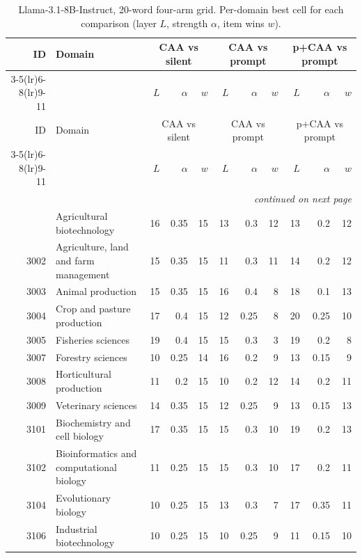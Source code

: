 \vspace{1.2em}
\begin{longtable}{r p{2.15cm} rrr rrr rrr}
\caption{Llama-3.1-8B-Instruct, 20-word four-arm grid. Per-domain best cell for each comparison (layer $L$, strength $\alpha$, item wins $w$).}
\label{tab:app-8b-20w} \\
\toprule
ID & Domain & \multicolumn{3}{c}{CAA vs silent} & \multicolumn{3}{c}{CAA vs prompt} & \multicolumn{3}{c}{p+CAA vs prompt} \\
\cmidrule(lr){3-5}\cmidrule(lr){6-8}\cmidrule(lr){9-11}
 & & $L$ & $\alpha$ & $w$ & $L$ & $\alpha$ & $w$ & $L$ & $\alpha$ & $w$ \\
\midrule
\endfirsthead
\toprule
ID & Domain & \multicolumn{3}{c}{CAA vs silent} & \multicolumn{3}{c}{CAA vs prompt} & \multicolumn{3}{c}{p+CAA vs prompt} \\
\cmidrule(lr){3-5}\cmidrule(lr){6-8}\cmidrule(lr){9-11}
 & & $L$ & $\alpha$ & $w$ & $L$ & $\alpha$ & $w$ & $L$ & $\alpha$ & $w$ \\
\midrule
\endhead
\midrule
\multicolumn{11}{r}{\emph{continued on next page}} \\
\endfoot
\bottomrule
\endlastfoot
3001 & Agricultural biotechnology & 16 & 0.35 & 15 & 13 & 0.3 & 12 & 13 & 0.2 & 12 \\
3002 & Agriculture, land and farm management & 15 & 0.35 & 15 & 11 & 0.3 & 11 & 14 & 0.2 & 12 \\
3003 & Animal production & 15 & 0.35 & 15 & 16 & 0.4 & 8 & 18 & 0.1 & 13 \\
3004 & Crop and pasture production & 17 & 0.4 & 15 & 12 & 0.25 & 8 & 20 & 0.25 & 10 \\
3005 & Fisheries sciences & 19 & 0.4 & 15 & 15 & 0.3 & 3 & 19 & 0.2 & 8 \\
3007 & Forestry sciences & 10 & 0.25 & 14 & 16 & 0.2 & 9 & 13 & 0.15 & 9 \\
3008 & Horticultural production & 11 & 0.2 & 15 & 10 & 0.2 & 12 & 14 & 0.2 & 11 \\
3009 & Veterinary sciences & 14 & 0.35 & 15 & 12 & 0.25 & 9 & 13 & 0.15 & 13 \\
3101 & Biochemistry and cell biology & 17 & 0.35 & 15 & 15 & 0.3 & 10 & 19 & 0.2 & 13 \\
3102 & Bioinformatics and computational biology & 11 & 0.25 & 15 & 15 & 0.3 & 10 & 17 & 0.2 & 11 \\
3104 & Evolutionary biology & 10 & 0.25 & 15 & 13 & 0.3 & 7 & 17 & 0.35 & 11 \\
3106 & Industrial biotechnology & 10 & 0.25 & 15 & 10 & 0.25 & 9 & 11 & 0.15 & 10 \\

\end{longtable}
